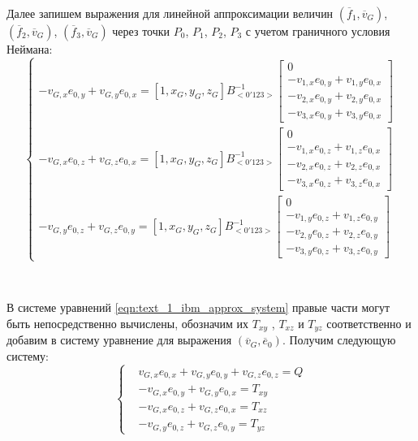 Далее запишем выражения для линейной аппроксимации величин $(\overline{f}_1, \overline{v}_G)$, $(\overline{f}_2, \overline{v}_G)$, $(\overline{f}_3, \overline{v}_G)$ через точки $P_0$, $P_1$, $P_2$, $P_3$ с учетом граничного условия Неймана:
\begin{equation}\label{eqn:text_1_ibm_approx_system}
	\left\{
		\begin{aligned}
			-v_{G,x}e_{0,y} + v_{G,y}e_{0,x} = [1,x_G,y_G,z_G] B_{<0'123>}^{-1}
			\begin{bmatrix}
				0 \\
				-v_{1,x}e_{0,y} + v_{1,y}e_{0,x} \\
				-v_{2,x}e_{0,y} + v_{2,y}e_{0,x} \\
				-v_{3,x}e_{0,y} + v_{3,y}e_{0,x}
			\end{bmatrix} \\
			-v_{G,x}e_{0,z} + v_{G,z}e_{0,x} = [1,x_G,y_G,z_G] B_{<0'123>}^{-1}
			\begin{bmatrix}
				0 \\
				-v_{1,x}e_{0,z} + v_{1,z}e_{0,x} \\
				-v_{2,x}e_{0,z} + v_{2,z}e_{0,x} \\
				-v_{3,x}e_{0,z} + v_{3,z}e_{0,x}
			\end{bmatrix} \\
			-v_{G,y}e_{0,z} + v_{G,z}e_{0,y} = [1,x_G,y_G,z_G] B_{<0'123>}^{-1}
			\begin{bmatrix}
				0 \\
				-v_{1,y}e_{0,z} + v_{1,z}e_{0,y} \\
				-v_{2,y}e_{0,z} + v_{2,z}e_{0,y} \\
				-v_{3,y}e_{0,z} + v_{3,z}e_{0,y}
			\end{bmatrix}
		\end{aligned}
	\right.
\end{equation}

\

В системе уравнений \eqref{eqn:text_1_ibm_approx_system} правые части могут быть непосредственно вычислены, обозначим их $T_{xy}$ , $T_{xz}$ и $T_{yz}$ соответственно и добавим в систему уравнение для выражения $(\overline{v}_G, \overline{e}_0)$.
Получим следующую систему:
\begin{equation}\label{eqn:text_1_ibm_sys3}
	\left\{
		\begin{aligned}
			& v_{G,x}e_{0,x} + v_{G,y}e_{0,y} + v_{G,z}e_{0,z} = Q \\
			& -v_{G,x}e_{0,y} + v_{G,y}e_{0,x} = T_{xy} \\
			& -v_{G,x}e_{0,z} + v_{G,z}e_{0,x} = T_{xz} \\
			& -v_{G,y}e_{0,z} + v_{G,z}e_{0,y} = T_{yz}			
		\end{aligned}
	\right.
\end{equation}

